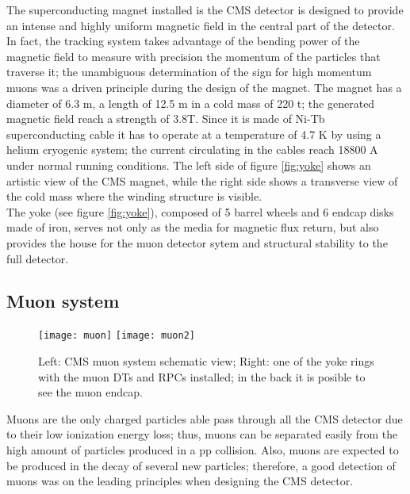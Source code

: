 \noindent The superconducting magnet installed is the CMS detector is designed to provide an intense and highly uniform magnetic field in the central part of the detector. In fact, the tracking system takes advantage of the bending power of the magnetic field to measure with precision the momentum of the particles that traverse it; the unambiguous determination of the sign for high momentum muons was a driven principle  during the design of the magnet. The magnet has a diameter of 6.3 m, a length of 12.5 m in a cold mass of 220 t; the generated magnetic field reach a strength of 3.8T. Since it is made of Ni-Tb superconducting cable it has to operate at a temperature of 4.7 K by using a helium cryogenic system; the current circulating in the cables reach 18800 A under normal running conditions. The left side of figure \ref{fig:yoke} shows an artistic view of the CMS magnet, while the right side shows a transverse view of the cold mass where the winding structure is visible. \\

\noindent The yoke (see figure \ref{fig:yoke}), composed of 5 barrel wheels and 6 endcap disks made of iron, serves not only as the media for magnetic flux return, but also provides the house for the muon detector sytem and structural stability to the full detector.     

\subsection{Muon system }

\begin{figure}[h!]
  \centering
  \texttt{[image: muon]}
  \texttt{[image: muon2]}
  \caption[CMS Muon system schematic view]{Left: CMS muon system schematic view; Right: one of the yoke rings with the muon DTs and RPCs installed; in the back it is posible to see the muon endcap\cite{muon}. }
  \label{fig:muon_chambers}
\end{figure}

\noindent Muons are the only charged particles able pass through all the CMS detector due to their low ionization energy loss; thus, muons can be separated easily from the high amount of particles produced in a pp collision. Also, muons are expected to be produced in the decay of several new particles; therefore, a good detection of muons was on the leading principles when designing the CMS detector.\\

